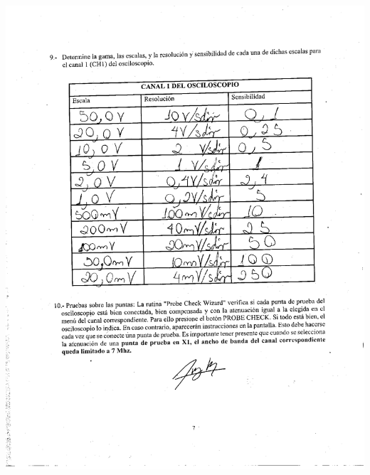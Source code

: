 \documentclass[12pt]{article}
\begin{document}
	\begin{center}
		\includegraphics[width=16cm,height=20cm]{Img/anex_lab_4_0003}
	\end{center}
	
\end{document}
